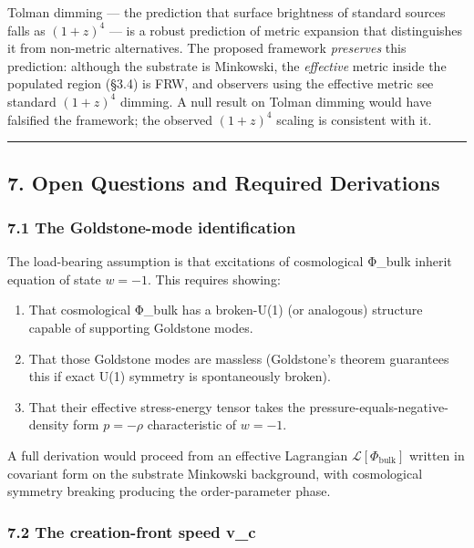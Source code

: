 \documentclass[
]{article}
\providecommand{\tightlist}{%
  \setlength{\itemsep}{0pt}\setlength{\parskip}{0pt}}
\begin{document}
Tolman dimming --- the prediction that surface brightness of standard
sources falls as \((1+z)^4\) --- is a robust prediction of metric
expansion that distinguishes it from non-metric alternatives. The
proposed framework \emph{preserves} this prediction: although the
substrate is Minkowski, the \emph{effective} metric inside the populated
region (§3.4) is FRW, and observers using the effective metric see
standard \((1+z)^4\) dimming. A null result on Tolman dimming would have
falsified the framework; the observed \((1+z)^4\) scaling is consistent
with it.

\begin{center}\rule{0.5\linewidth}{0.5pt}\end{center}

\subsection{7. Open Questions and Required
Derivations}\label{open-questions-and-required-derivations}

\subsubsection{7.1 The Goldstone-mode
identification}\label{the-goldstone-mode-identification}

The load-bearing assumption is that excitations of cosmological Φ\_bulk
inherit equation of state \(w = -1\). This requires showing:

\begin{enumerate}
\def\labelenumi{\arabic{enumi}.}
\tightlist
\item
  That cosmological Φ\_bulk has a broken-U(1) (or analogous) structure
  capable of supporting Goldstone modes.
\item
  That those Goldstone modes are massless (Goldstone's theorem
  guarantees this if exact U(1) symmetry is spontaneously broken).
\item
  That their effective stress-energy tensor takes the
  pressure-equals-negative-density form \(p = -\rho\) characteristic of
  \(w = -1\).
\end{enumerate}

A full derivation would proceed from an effective Lagrangian
\(\mathcal{L}[\Phi_{\text{bulk}}]\) written in covariant form on the
substrate Minkowski background, with cosmological symmetry breaking
producing the order-parameter phase.

\subsubsection{7.2 The creation-front speed
v\_c}\label{the-creation-front-speed-v_c}
\end{document}
